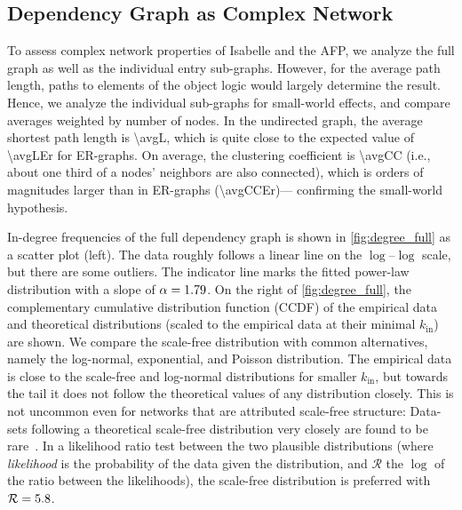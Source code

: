 \subsection{Dependency Graph as Complex Network}
To assess complex network properties of Isabelle and the AFP,
we analyze the full graph as well as the individual entry sub-graphs.
However, for the average path length, paths to elements of the object logic would largely determine the result.
Hence, we analyze the individual sub-graphs for small-world effects, and compare averages weighted by number of nodes.
In the undirected graph, the average shortest path length is \num[round-mode=places,round-precision=1]{\avgL},
which is quite close to the expected value of \num[round-mode=places,round-precision=1]{\avgLEr} for ER-graphs.
On average, the clustering coefficient is \num[round-mode=figures,round-precision=2]{\avgCC}
(i.e., about one third of a nodes' neighbors are also connected), which is orders of magnitudes larger than in ER-graphs (\num[round-mode=figures,round-precision=2]{\avgCCEr})---%
confirming the small-world hypothesis.



In-degree frequencies of the full dependency graph is shown in \autoref{fig:degree_full} as a scatter plot (left).
The data roughly follows a linear line on the $\log$--$\log$ scale,
but there are some outliers.
The indicator line marks the fitted power-law distribution with a slope of $\alpha = \num[round-mode=places,round-precision=2]{\degreeFullAlpha}$.
On the right of \autoref{fig:degree_full},
the complementary cumulative distribution function (CCDF) of the empirical data and theoretical distributions (scaled to the empirical data at their minimal $k_\text{in}$) are shown.
We compare the scale-free distribution with common alternatives, namely the log-normal, exponential, and Poisson distribution.
The empirical data is close to the scale-free and log-normal distributions for smaller $k_\text{in}$,
but towards the tail it does not follow the theoretical values of any distribution closely.
This is not uncommon even for networks that are attributed scale-free structure:
Data-sets following a theoretical scale-free distribution very closely are found to be rare~\cite{ScalefreeRare2019Broido}.
In a likelihood ratio test between the two plausible distributions
(where \emph{likelihood} is the probability of the data given the distribution, and $\mathcal{R}$ the $\log$ of the ratio between the likelihoods),
the scale-free distribution is preferred with $\mathcal{R}=\num[round-mode=places,round-precision=1]{\degreeFullPlLnR}$.

